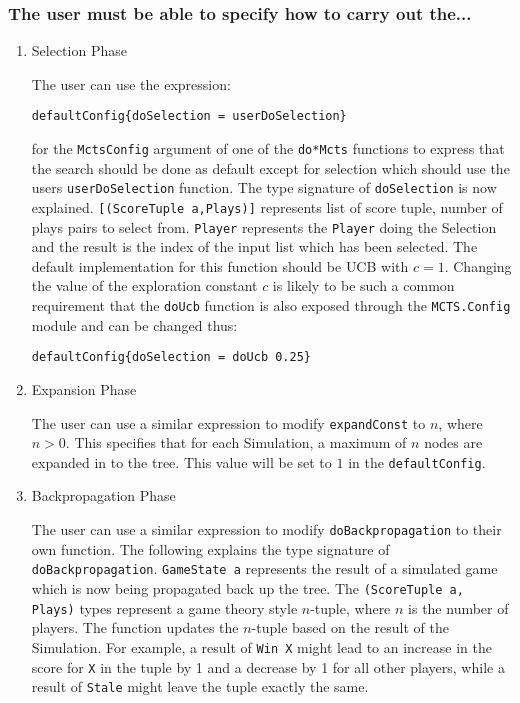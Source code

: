 \subsubsection{The user must be able to specify how to carry out the...}

\begin{enumerate}
\item Selection Phase
\par The user can use the expression:\par
\verb|defaultConfig{doSelection = userDoSelection}|
\par for the \verb|MctsConfig| argument of one of the \verb|do*Mcts| functions to express that the search should be done as default except for selection which should use the users \verb|userDoSelection| function. The type signature of \texttt{doSelection} is now explained. \verb|[(ScoreTuple a,Plays)]| represents list of score tuple, number of plays pairs to select from. \texttt{Player} represents the \texttt{Player} doing the Selection and the result is the index of the input list which has been selected. The default implementation for this function should be {UCB} with $c=1$. Changing the value of the exploration constant $c$ is likely to be such a common requirement that the \verb|doUcb| function is also exposed through the \verb|MCTS.Config| module and can be changed thus:
\par
\verb|defaultConfig{doSelection = doUcb 0.25}|
\item Expansion Phase
\par The user can use a similar expression to modify \verb|expandConst| to $n$, where $n>0$. This specifies that for each Simulation, a maximum of $n$ nodes are expanded in to the tree. This value will be set to $1$ in the \verb|defaultConfig|.

\item Backpropagation Phase
\par The user can use a similar expression to modify \verb|doBackpropagation| to their own function. The following explains the type signature of \texttt{doBackpropagation}. \texttt{GameState a} represents the result of a simulated game which is now being propagated back up the tree. The \texttt{(ScoreTuple a, Plays)} types represent a game theory style $n$-tuple, where $n$ is the number of players. The function updates the $n$-tuple based on the result of the Simulation. For example, a result of \verb|Win X| might lead to an increase in the score for \verb|X| in the tuple by 1 and a decrease by 1 for all other players, while a result of \verb|Stale| might leave the tuple exactly the same.


\end{enumerate}

